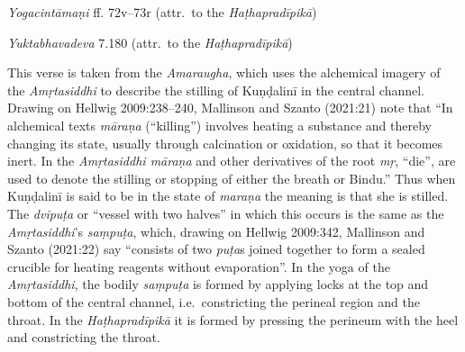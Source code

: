 \begin{ekdosis}
\begin{testimonia}[hp03_012]
\emph{Yogacintāmaṇi} ff. 72v–73r (attr.~to the \emph{Haṭhapradīpikā}) %
\begin{versinnote}
\tl{\var{dvipuṭā ] em., dvipaṭā° L, dvipadā° N.} \\!}
\end{versinnote}

\emph{Yuktabhavadeva} 7.180 (attr.~to the \emph{Haṭhapradīpikā})
\begin{versinnote}
\end{versinnote}
\end{testimonia}

\begin{philcomm}[hp03_012]
This verse is taken from the \emph{Amaraugha}, which uses the alchemical imagery of the \emph{Amṛtasiddhi} to describe the stilling of Kuṇḍalinī in the central channel. Drawing on Hellwig 2009:238–240, Mallinson and Szanto (2021:21) note that “In alchemical texts \emph{māraṇa} (“killing”) involves heating a substance and thereby changing its state, usually through calcination or oxidation, so that it becomes inert. In the \emph{Amṛtasiddhi māraṇa} and other derivatives of the root \emph{mṛ}, “die”, are used to denote the stilling or stopping of either the breath or Bindu.” Thus when Kuṇḍalinī is said to be in the state of \emph{maraṇa} the meaning is that she is stilled. The \emph{dvipuṭa} or “vessel with two halves” in which this occurs is the same as the \emph{Amṛtasiddhi}’s \emph{saṃpuṭa}, which, drawing on Hellwig 2009:342, Mallinson and Szanto (2021:22) say “consists of two \emph{puṭa}s joined together to form a sealed crucible for heating reagents without evaporation”. In the yoga of the \emph{Amṛtasiddhi}, the bodily \emph{saṃpuṭa} is formed by applying locks at the top and bottom of the central channel, i.e.~constricting the perineal region and the throat. In the \emph{Haṭhapradīpikā} it is formed by pressing the perineum with the heel and constricting the throat.


\end{philcomm}
\end{ekdosis}

